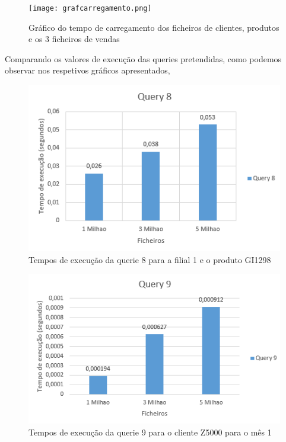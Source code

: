 \begin{figure}[h!]
	\centering
	\texttt{[image: grafcarregamento.png]}  
	\caption{Gráfico do tempo de carregamento dos ficheiros de clientes, produtos e os 3 ficheiros de vendas}  
\end{figure}

Comparando os valores de execução das queries pretendidas, como podemos observar nos respetivos gráficos apresentados,

  	\begin{minipage}{0.45\linewidth}
  		\begin{figure}[H]
  			\includegraphics[width=\linewidth]{grafq8}
  			\caption{Tempos de execução da querie 8 para a filial 1 e o produto GI1298}
  		\end{figure}
  	\end{minipage}
  	\hspace{0.05\linewidth}
  	\begin{minipage}{0.45\linewidth}
  		\begin{figure}[H]
  			\includegraphics[width=\linewidth]{grafq9}
  			\caption{Tempos de execução da querie 9 para o cliente Z5000 para o mês 1}
  		\end{figure}
  	\end{minipage}
  	
